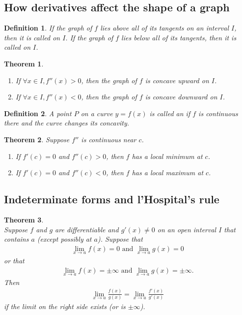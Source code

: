 \documentclass{article}
\theoremstyle{sltheorem}
\newtheorem{definition}{Definition}[section]
\newtheorem{theorem}{Theorem}[section]
\begin{document}
\subsection{How derivatives affect the shape of a graph}
\begin{definition}
    If the graph of $f$ lies above all of its tangents on an interval $I$, then it is called  on $I$. If the graph of $f$ lies below all of its tangents, then it is called  on $I$.
\end{definition}
\begin{theorem}
    \begin{enumerate}
        \item If $\forall x\in I, f''(x)>0$, then the graph of $f$ is concave upward on $I$.
        \item If $\forall x\in I, f''(x)<0$, then the graph of $f$ is concave downward on $I$.
    \end{enumerate}
\end{theorem}
\begin{definition}
    A point $P$ on a curve $y=f(x)$ is called an  if $f$ is continuous there and the curve changes its concavity.
\end{definition}
\begin{theorem}
    Suppose $f''$ is continuous near $c$.
    \begin{enumerate}
        \item If $f'(c)=0$ and $f''(c)>0$, then $f$ has a local minimum at $c$.
        \item If $f'(c)=0$ and $f''(c)<0$, then $f$ has a local maximum at $c$.
    \end{enumerate}
\end{theorem}
\subsection{Indeterminate forms and l'Hospital's rule}
\begin{theorem}
    \\
    Suppose $f$ and $g$ are differentiable and $g'(x)\not=0$ on an open interval $I$ that contains $a$ (except possibly at $a$). Suppose that
    \begin{align*}
        \lim_{x\to a}f(x)=0\text{ and } \lim_{x\to a}g(x)=0
    \end{align*}
    or that
    \begin{align*}
        \lim_{x\to a}f(x)=\pm\infty \text{ and } \lim_{x\to a}g(x) = \pm\infty.
    \end{align*}
    Then
    \begin{align*}
        \lim_{x\to a}\frac{f(x)}{g(x)}=\lim_{x\to a}\frac{f'(x)}{g'(x)}
    \end{align*}
    if the limit on the right side exists (or is $\pm\infty$).
\end{theorem}
\setcounter{subsection}{6}
\end{document}

